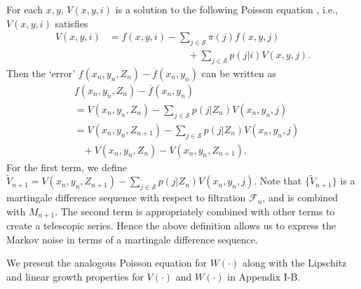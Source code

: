 \documentclass[letterpaper, 10 pt, conference]{ieeeconf}  %
\theoremstyle{definition}
\theoremstyle{plain}
\newcommand{\barf}{\overline{f}}
\newcommand{\Scal}{\mathcal{S}}
\begin{document}
For each $x,y$, $V(x,y,i)$ is a solution to the following Poisson equation \cite{Benaim}, i.e., $V(x,y,i)$ satisfies
\begin{align*}
    V(x,y,i)&=f(x,y,i)-\sum_{j\in\Scal}\pi(j)f(x,y,j)\\
    &\;\;\;\;\;\;\;\;\;\;\;\;\;\;\;\;\;\;\;\;\;\;\;\;\;\;\;\;\;+\sum_{j\in\Scal}p(j|i)V(x,y,j).
\end{align*}
Then the `error' $f(x_n,y_n,Z_n)-\barf(x_n,y_n)$ can be written as
\begin{align*}
   &f(x_n,y_n,Z_n)-\barf(x_n,y_n)\\
   &=V(x_n,y_n,Z_n)-\sum_{j\in\Scal}p(j|Z_n)V(x_n,y_n,j) \nonumber\\
   &=V(x_n,y_n,Z_{n+1})-\sum_{j\in\Scal}p(j|Z_n)V(x_n,y_n,j)\nonumber\\
   &\;\;\;+V(x_n,y_n,Z_n)-V(x_n,y_n,Z_{n+1}).
\end{align*}
For the first term, we define ${\tilde{V}_{n+1}}=V(x_n,y_n,Z_{n+1})-\sum_{j\in\Scal}p(j|Z_n)V(x_n,y_n,j)$. Note that $\{\tilde{V}_{n+1}\}$ is a martingale difference sequence with respect to filtration $\mathcal{F}_n$, and is combined with $M_{n+1}$. The second term is appropriately combined with other terms to create a telescopic series. Hence the above definition allows us to express the Markov noise in terms of a martingale difference sequence.

We present the analogous Poisson equation for $W(\cdot)$ along with the Lipschitz and linear growth properties for $V(\cdot)$ and $W(\cdot)$ in Appendix I-B.
\end{document}
